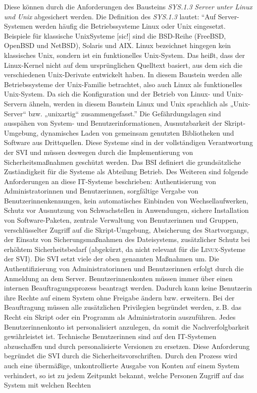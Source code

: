 Diese können durch die Anforderungen des Bausteins \textit{SYS.1.3 Server unter Linux und Unix} abgesichert werden. Die Definition des \textit{SYS.1.3} lautet: \enquote{Auf Server-Systemen werden häufig die Betriebssysteme Linux oder Unix eingesetzt. Beispiele für klassische UnixSysteme [sic!] sind die BSD-Reihe (FreeBSD, OpenBSD und NetBSD), Solaris und AIX. Linux bezeichnet hingegen kein klassisches Unix, sondern ist ein funktionelles Unix-System. Das heißt, dass der Linux-Kernel nicht auf dem ursprünglichen Quelltext basiert, aus dem sich die verschiedenen Unix-Derivate entwickelt haben. In diesem Baustein werden alle Betriebssysteme der Unix-Familie betrachtet, also auch Linux als funktionelles Unix-System. Da sich die	Konfiguration und der Betrieb von Linux- und Unix-Servern ähneln, werden in diesem Baustein Linux und Unix sprachlich als „Unix-Server“ bzw. „unixartig“ zusammengefasst.}\autocite[][S.\,480]{bundesamt_fur_sicherheit_in_der_informationstechnik_bsi_it-grundschutz-kompendium_2020} Die Gefährdungslagen sind ausspähen von System- und Benutzerinformationen, Ausnutzbarkeit der Skript-Umgebung, dynamisches Laden von gemeinsam genutzten Bibliotheken und Software aus Drittquellen.\autocite[vgl.][S.\,480]{bundesamt_fur_sicherheit_in_der_informationstechnik_bsi_it-grundschutz-kompendium_2020} Diese Systeme sind in der vollständigen Verantwortung der \ac{SVI} und müssen deswegen durch die Implementierung von Sicherheitsmaßnahmen geschützt werden. Das \ac{BSI} definiert die grundsätzliche Zuständigkeit für die Systeme als Abteilung Betrieb. Des Weiteren sind folgende Anforderungen an diese IT-Systeme beschrieben: Authentisierung von Administratorinnen und Benutzerinnen, sorgfältige Vergabe von Benutzerinnenkennungen, kein automatisches Einbinden von Wechsellaufwerken, Schutz vor Ausnutzung von Schwachstellen in Anwendungen, sichere Installation von Software-Paketen, zentrale Verwaltung von Benutzerinnen und Gruppen, verschlüsselter Zugriff auf die Skript-Umgebung, Absicherung des Startvorgangs, der Einsatz von Sicherungsmaßnahmen des Dateisystems, zusätzlicher Schutz bei erhöhtem Sicherheitsbedarf (abgekürzt, da nicht relevant für die \textsc{Linux}-Systeme der \ac{SVI})\autocite[vgl.][S.\,480-482]{bundesamt_fur_sicherheit_in_der_informationstechnik_bsi_it-grundschutz-kompendium_2020}. Die \ac{SVI} setzt viele der oben genannten Maßnahmen um. Die Authentifizierung von Administratorinnen und Benutzerinnen erfolgt durch die Anmeldung an dem Server. Benutzerinnenkonten müssen immer über einen internen Beauftragungsprozess beantragt werden. Dadurch kann keine Benutzerin ihre Rechte auf einem System ohne Freigabe ändern bzw. erweitern. Bei der Beauftragung müssen alle zusätzlichen Privilegien begründet werden, z.\,B. das Recht ein Skript oder ein Programm als Administratorin auszuführen. Jedes Benutzerinnenkonto ist personalisiert anzulegen, da somit die Nachverfolgbarkeit gewährleistet ist. Technische Benutzerinnen sind auf den IT-Systemen abzuschaffen und durch personalisierte Versionen zu ersetzen. Diese Anforderung begründet die \ac{SVI} durch die Sicherheitsvorschriften. Durch den Prozess wird auch eine übermäßige, unkontrollierte Ausgabe von Konten auf einem System verhindert, so ist zu jedem Zeitpunkt bekannt, welche Personen Zugriff auf das System mit welchen Rechten 